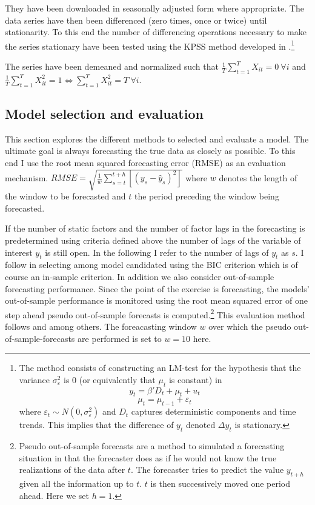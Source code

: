 \documentclass[11pt]{article}
\begin{document}
They have been downloaded in seasonally adjusted form where appropriate. The data series have then been differenced (zero times, once or twice) until stationarity. To this end the number of differencing operations necessary to make the series stationary have been tested using the KPSS method developed in \citet{kwiatkowski1992testing}.\footnote{The method consists of constructing an LM-test for the hypothesis that the variance $\sigma^2_\varepsilon$ is 0 (or equivalently that $\mu_t$ is constant) in $$y_t = \beta'D_t + \mu_t + u_t$$ $$\mu_t = \mu_{t-1} + \varepsilon_t$$ where $\varepsilon_t \sim N(0, \sigma^2_\varepsilon)$ and $D_t$ captures deterministic components and time trends. This implies that the difference of $y_t$ denoted $\Delta y_t$ is stationary.}

The series have been demeaned and normalized such that $\frac{1}{T}\sum_{t=1}^T X_{it} = 0 \ \forall i$ and $\frac{1}{T}\sum_{t=1}^T X_{it}^2 = 1 \Leftrightarrow \sum_{t=1}^T X_{it}^2 = T \ \forall i$. \\


\subsection{Model selection and evaluation}
This section explores the different methods to selected and evaluate a model. The ultimate goal is always forecasting the true data as closely as possible. To this end I use the root mean squared forecasting error (RMSE) as an evaluation mechanism. $RMSE = \sqrt{\frac{1}{w}\sum_{s=t}^{t+h}[(y_s - \hat y_s)^2]}$ where $w$ denotes the length of the window to be forecasted and $t$ the period preceding the window being forecasted.

If the number of static factors and the number of factor lags in the forecasting is predetermined using criteria defined above the number of lags  of the variable of interest $y_t$ is still open. In the following I refer to the number of lags of $y_t$ as $s$. I follow \citet{bai2008forecasting} in selecting among model candidated using the BIC criterion which is of course an in-sample criterion. In addition we also consider out-of-sample forecasting performance. Since the point of the exercise is forecasting, the models' out-of-sample performance is monitored using the root mean squared error of one step ahead pseudo out-of-sample forecasts is computed.\footnote{Pseudo out-of-sample forecasts are a method to simulated a forecasting situation in that the forecaster does as if he would not know the true realizations of the data after $t$. The forecaster tries to predict the value $y_{t+h}$ given all the information up to $t$. $t$ is then successively moved one period ahead. Here we set $h=1$.} This evaluation method follows \citet{forni2005the} and \citet{bai2008forecasting} among others. The foreacasting window $w$ over which the pseudo out-of-sample-forecasts are performed is set to $w=10$ here. \\
\end{document}
